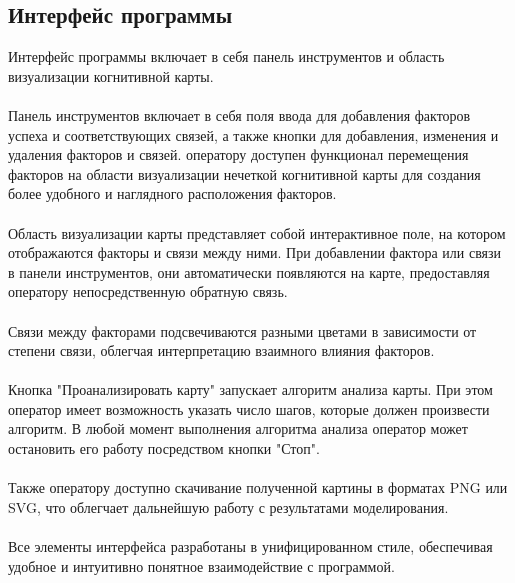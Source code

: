 \documentclass{article}
\begin{document}
    \subsection {Интерфейс программы}
    Интерфейс программы включает в себя панель инструментов и область визуализации когнитивной карты.\\
    ~\\
    Панель инструментов включает в себя поля ввода для добавления факторов успеха и соответствующих связей, а также кнопки для добавления, изменения и удаления факторов и связей. оператору доступен функционал перемещения факторов на области визуализации нечеткой когнитивной карты для создания более удобного и наглядного расположения факторов.\\
    ~\\
    Область визуализации карты представляет собой интерактивное поле, на котором отображаются факторы и связи между ними. При добавлении фактора или связи в панели инструментов, они автоматически появляются на карте, предоставляя оператору непосредственную обратную связь.\\
    ~\\
    Связи между факторами подсвечиваются разными цветами в зависимости от степени связи, облегчая интерпретацию взаимного влияния факторов.\\
    ~\\
    Кнопка "{}Проанализировать карту"{} запускает алгоритм анализа карты. При этом оператор имеет возможность указать число шагов, которые должен произвести алгоритм. В любой момент выполнения алгоритма анализа оператор может остановить его работу посредством кнопки "{}Стоп"{}.\\
    ~\\
    Также оператору доступно скачивание полученной картины в форматах PNG или SVG, что облегчает дальнейшую работу с результатами моделирования.\\
    ~\\
    Все элементы интерфейса разработаны в унифицированном стиле, обеспечивая удобное и интуитивно понятное взаимодействие с программой.\\
\end{document}
